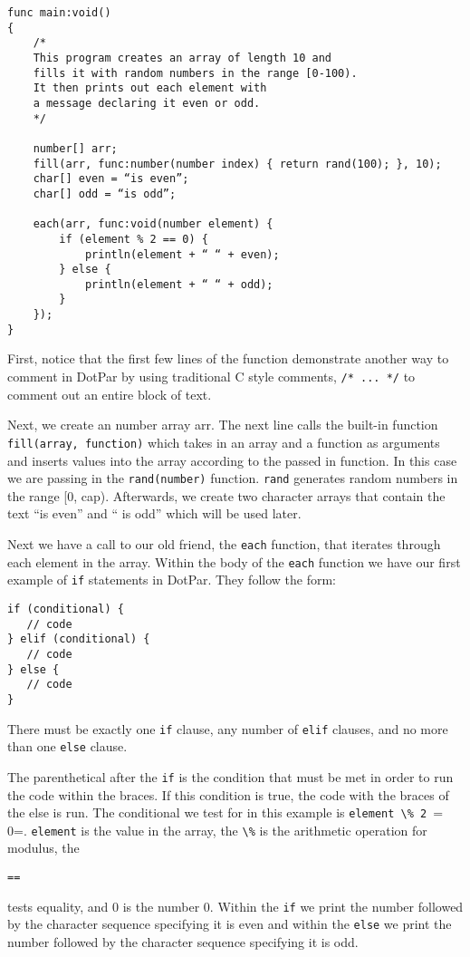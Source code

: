 \documentclass{article}
\begin{document}
\begin{verbatim}
func main:void()
{
    /*
    This program creates an array of length 10 and 
    fills it with random numbers in the range [0-100).
    It then prints out each element with 
    a message declaring it even or odd.  
    */

    number[] arr;
    fill(arr, func:number(number index) { return rand(100); }, 10);
    char[] even = “is even”;
    char[] odd = “is odd”;

    each(arr, func:void(number element) {
        if (element % 2 == 0) {
            println(element + “ “ + even);
        } else {
            println(element + “ “ + odd);
        }
    });
}
\end{verbatim}

First, notice that the first few lines of the function demonstrate another way to comment in DotPar by using traditional C style comments, \verb=/* ... */= to comment out an entire block of text.

Next, we create an number array arr. The next line calls the built-in function \verb=fill(array, function)= which takes in an array and a function as arguments and inserts values into the array according to the passed in function. In this case we are passing in the \verb=rand(number)= function. \verb=rand= generates random numbers in the range [0, cap). Afterwards, we create two character arrays that contain the text ``is even'' and `` is odd'' which will be used later.

Next we have a call to our old friend, the \verb=each= function, that iterates through each element in the array. Within the body of the \verb=each= function we have our first example of \verb=if= statements in DotPar. They follow the form: 

\begin{verbatim}
if (conditional) {
   // code
} elif (conditional) {
   // code
} else {
   // code
}
\end{verbatim}

There must be exactly one \verb=if= clause, any number of \verb=elif= clauses, and no more than one \verb=else= clause.

The parenthetical after the \verb=if= is the condition that must be met in order to run the code within the braces. If this condition is true, the code with the braces of the else is run. The conditional we test for in this example is \verb=element \% 2 == 0=. \verb=element= is the value in the array, the \verb=\%= is the arithmetic operation for modulus, the \begin{verbatim}== 
\end{verbatim} tests equality, and 0 is the number 0. Within the \verb=if= we print the number followed by the character sequence specifying it is even and within the \verb=else= we print the number followed by the character sequence specifying it is odd.
\end{document}
